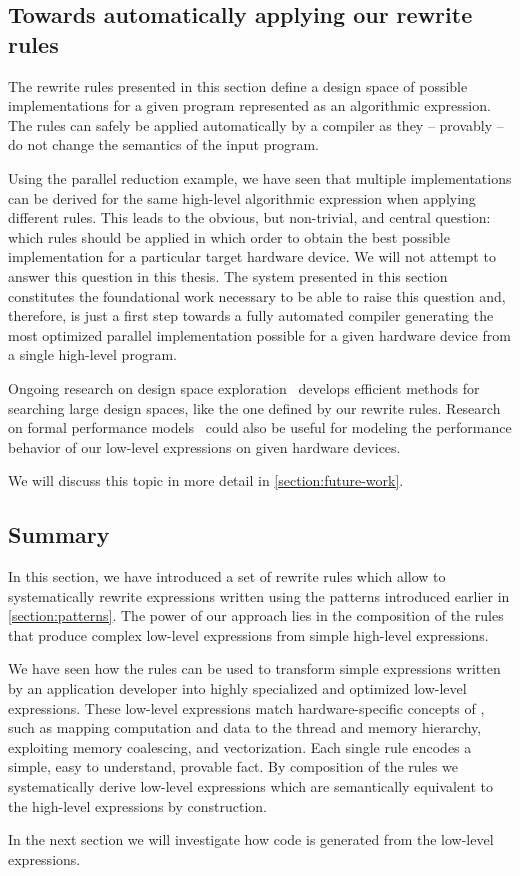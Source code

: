 \FloatBarrier

\subsection{Towards automatically applying our rewrite rules}
The rewrite rules presented in this section define a design space of possible implementations for a given program represented as an algorithmic expression.
The rules can safely be applied automatically by a compiler as they -- provably -- do not change the semantics of the input program.

Using the parallel reduction example, we have seen that multiple implementations can be derived for the same high-level algorithmic expression when applying different rules.
This leads to the obvious, but non-trivial, and central question:
which rules should be applied in which order to obtain the best possible implementation for a particular target hardware device.
We will not attempt to answer this question in this thesis.
The system presented in this section constitutes the foundational work necessary to be able to raise this question and, therefore, is just a first step towards a fully automated compiler generating the most optimized parallel implementation possible for a given hardware device from a single high-level program.

Ongoing research on design space exploration~\cite{} develops efficient methods for searching large design spaces, like the one defined by our rewrite rules.
Research on formal performance models~\cite{} could also be useful for modeling the performance behavior of our low-level expressions on given hardware devices.

We will discuss this topic in more detail in \autoref{section:future-work}.



\subsection{Summary}
In this section, we have introduced a set of rewrite rules which allow to systematically rewrite expressions written using the patterns introduced earlier in \autoref{section:patterns}.
The power of our approach lies in the composition of the rules that produce complex low-level expressions from simple high-level expressions.

We have seen how the rules can be used to transform simple expressions written by an application developer into highly specialized and optimized low-level \OpenCL expressions.
These low-level expressions match hardware-specific concepts of \OpenCL, such as mapping computation and data to the thread and memory hierarchy, exploiting memory coalescing, and vectorization.
Each single rule encodes a simple, easy to understand, provable fact.
By composition of the rules we systematically derive low-level expressions which are semantically equivalent to the high-level expressions by construction.

In the next section we will investigate how \OpenCL code is generated from the low-level expressions.

